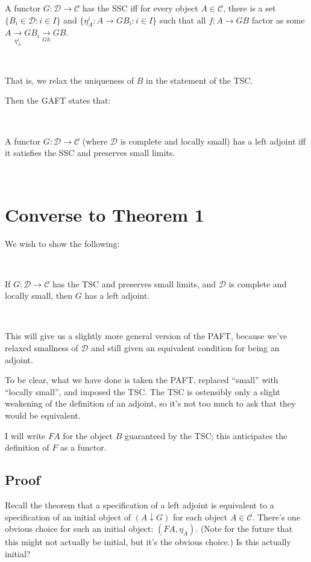 \documentclass[11pt]{amsart}
\begin{document}
\begin{defn} A functor $G: \mathcal{D} \to \mathcal{C}$ has the SSC iff for every object $A \in \mathcal{C}$, there is a set $\{ B_i \in \mathcal{D} : i \in I \}$ and $\{ \eta_A^i : A \to G B_i : i \in I \}$ such that all $f: A \to GB$ factor as some $A \xrightarrow[\eta_A^i]{} G B_i \xrightarrow[Gh]{} GB$.
\end{defn}

\

That is, we relax the uniqueness of $B$ in the statement of the TSC.

Then the GAFT states that:

\

\begin{thm} A functor $G: \mathcal{D} \to \mathcal{C}$ (where $\mathcal{D}$ is complete and locally small) has a left adjoint iff it satisfies the SSC and preserves small limits.
\end{thm}

\

\section{Converse to Theorem 1}

We wish to show the following:

\

\begin{thm} If $G: \mathcal{D} \to \mathcal{C}$ has the TSC and preserves small limits, and $\mathcal{D}$ is complete and locally small, then $G$ has a left adjoint.
\end{thm}

\

This will give us a slightly more general version of the PAFT, because we've relaxed smallness of $\mathcal{D}$ and still given an equivalent condition for being an adjoint.

To be clear, what we have done is taken the PAFT, replaced ``small'' with ``locally small'', and imposed the TSC.
The TSC is ostensibly only a slight weakening of the definition of an adjoint, so it's not too much to ask that they would be equivalent.

I will write $FA$ for the object $B$ guaranteed by the TSC; this anticipates the definition of $F$ as a functor.

\subsection{Proof}
Recall the theorem that a specification of a left adjoint is equivalent to a specification of an initial object of $(A \downarrow G)$ for each object $A \in \mathcal{C}$.
There's one obvious choice for such an initial object: $(FA, \eta_A)$.
(Note for the future that this might not actually be initial, but it's the obvious choice.)
Is this actually initial?
\end{document}
